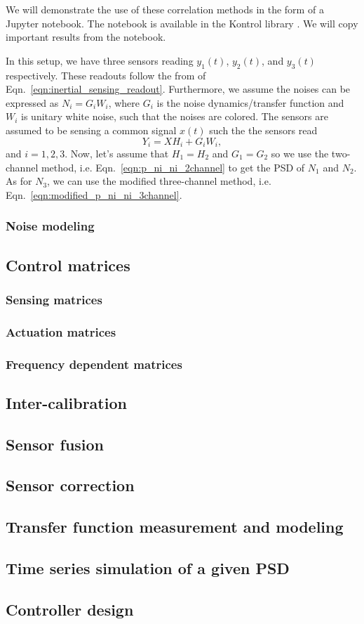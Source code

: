 We will demonstrate the use of these correlation methods in the form of a Jupyter notebook.
The notebook is available in the Kontrol library \cite{kontrol_noise_estimation}.
We will copy important results from the notebook.

In this setup, we have three sensors reading $y_1(t)$, $y_2(t)$, and $y_3(t)$ respectively.
These readouts follow the from of Eqn.~\eqref{eqn:inertial_sensing_readout}.
Furthermore, we assume the noises can be expressed as $N_i = G_iW_i$, where $G_i$ is the noise dynamics/transfer function and $W_i$ is unitary white noise, such that the noises are colored.
The sensors are assumed to be sensing a common signal $x(t)$ such the the sensors read
\begin{equation}
	Y_i = XH_i + G_iW_i,
\end{equation}
and $i=1,2,3$.
Now, let's assume that $H_1=H_2$ and $G_1=G_2$ so we use the two-channel method, i.e. Eqn.~\eqref{eqn:p_ni_ni_2channel} to get the PSD of $N_1$ and $N_2$.
As for $N_3$, we can use the modified three-channel method, i.e. Eqn.~\eqref{eqn:modified_p_ni_ni_3channel}.



\subsubsection{Noise modeling \label{sec:noise_modeling_baseline}}
\subsection{Control matrices}
\subsubsection{Sensing matrices}
\subsubsection{Actuation matrices}
\subsubsection{Frequency dependent matrices}
\subsection{Inter-calibration}
\subsection{Sensor fusion}
\subsection{Sensor correction}
\subsection{Transfer function measurement and modeling}
\subsection{Time series simulation of a given PSD}
\subsection{Controller design}

